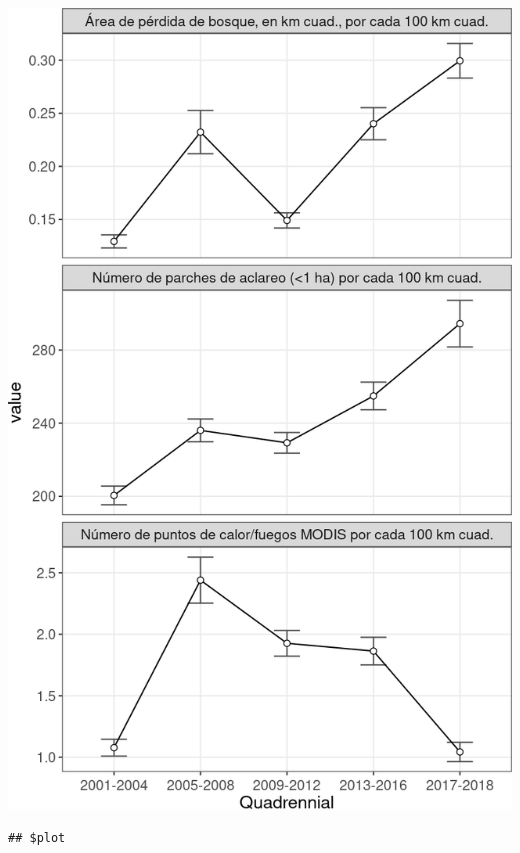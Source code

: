 \documentclass[10pt,landscape,a3paper]{article}
\begin{document}
\begin{center}\includegraphics{img/modelling/aa-eda-ts-15} \end{center}

\begin{verbatim}
## $plot
\end{verbatim}
\end{document}
